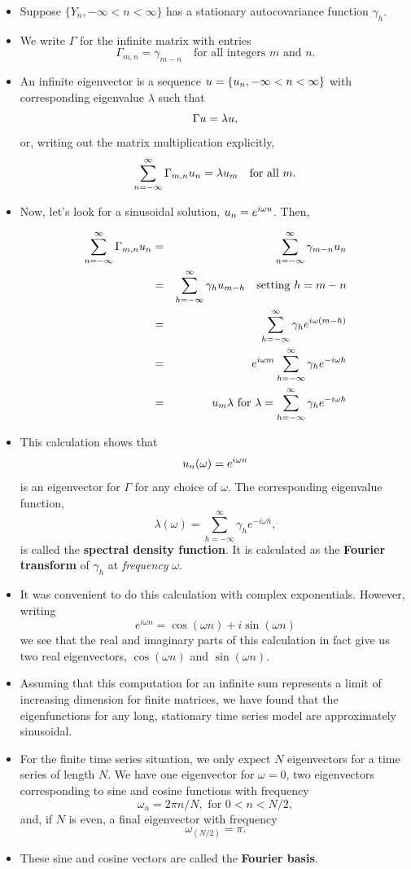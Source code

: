\documentclass[]{article}
\begin{document}
\begin{itemize}
\item
  Suppose \(\{Y_n,-\infty<n<\infty\}\) has a stationary autocovariance
  function \(\gamma_h\).
\item
  We write \(\Gamma\) for the infinite matrix with entries
  \[ \Gamma_{m,n} = \gamma_{m-n} \quad \mbox{for all integers $m$ and $n$}.\]
\item
  An infinite eigenvector is a sequence
  \(u=\{u_n, -\infty<n<\infty\}\) with corresponding eigenvalue
  \(\lambda\) such that \[\Gamma u = \lambda u,\] or, writing out
  the matrix multiplication explicitly,
  \[\sum_{n=-\infty}^\infty \Gamma_{m,n} u_n = \lambda u_m\quad \mbox{for all $m$}.\]
\item
  Now, let's look for a sinusoidal solution, \(u_n = e^{i\omega n}\).
  Then,

  \begin{eqnarray}
  \sum_{n=-\infty}^\infty \Gamma_{m,n} u_n 
  &=& \sum_{n=-\infty}^\infty \gamma_{m-n} u_n 
  \\
  &=& \sum_{h=-\infty}^\infty \gamma_{h}  u_{m-h} \quad \mbox{setting $h=m-n$}
  \\
  &=& \sum_{h=-\infty}^\infty \gamma_{h}  e^{i\omega(m-h)}
  \\
  &=& e^{i\omega m} \sum_{h=-\infty}^\infty \gamma_{h}  e^{-i\omega h}
  \\
  &=& u_m \lambda \mbox{ for } \lambda= \sum_{h=-\infty}^\infty \gamma_{h}  e^{-i\omega h}
  \end{eqnarray}
\item
  This calculation shows that \[u_n(\omega) = e^{i\omega n}\] is an
  eigenvector for \(\Gamma\) for any choice of \(\omega\). The
  corresponding eigenvalue function,
  \[\lambda(\omega)= \sum_{h=-\infty}^\infty \gamma_{h}  e^{-i\omega h},\]
  is called the \textbf{spectral density function}. It is calculated as
  the \textbf{Fourier transform} of \(\gamma_h\) at \emph{frequency}
  \(\omega\).
\item
  It was convenient to do this calculation with complex exponentials.
  However, writing
  \[ e^{i\omega n} = \cos(\omega n) + i \sin(\omega n)\] we see that the
  real and imaginary parts of this calculation in fact give us two real
  eigenvectors, \(\cos(\omega n)\) and \(\sin(\omega n)\).
\item
  Assuming that this computation for an infinite sum represents a limit
  of increasing dimension for finite matrices, we have found that the
  eigenfunctions for any long, stationary time series model are
  approximately sinusoidal.
\item
  For the finite time series situation, we only expect \(N\)
  eigenvectors for a time series of length \(N\). We have one
  eigenvector for \(\omega=0\), two eigenvectors corresponding to sine
  and cosine functions with frequency
  \[\omega_{n} = 2\pi n/N, \mbox{ for $0<n<N/2$},\] and, if \(N\) is
  even, a final eigenvector with frequency \[\omega_{(N/2)} = \pi.\]
\item
  These sine and cosine vectors are called the \textbf{Fourier basis}.
\end{itemize}
\end{document}
